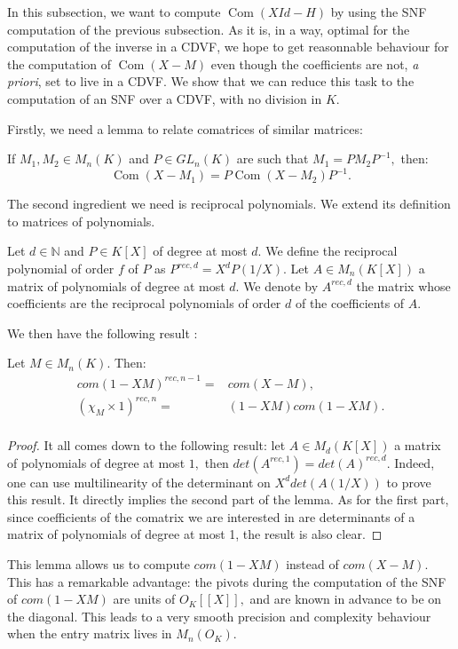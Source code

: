\documentclass{sig-alternate-05-2015}
\DeclareMathOperator{\com}{Com}
\begin{document}
In this subsection, we want to compute $\com (X Id -H)$
by using the SNF computation of the previous subsection.
As it is, in a way, optimal for the computation of the
inverse in a CDVF, we hope to get reasonnable behaviour
for the computation of $\com (X-M)$ even though the coefficients
are not, \textit{a priori}, set to live in a CDVF.
We show that we can reduce this task to the computation
of an SNF over a CDVF, with no division in $K.$

Firstly, we need a lemma to relate comatrices of
similar matrices:

\begin{lem} \label{lem:comatrix_of_similar}
If $M_1,M_2 \in M_n(K)$ and $P \in GL_n (K)$ are such that
$M_1=PM_2P^{-1},$ then:
\[ \com (X-M_1)=P \com (X-M_2) P^{-1}. \] 
\end{lem}

The second ingredient we need is reciprocal polynomials.
We extend its definition to matrices of polynomials.
\begin{deftn}
Let $d \in \mathbb{N}$ and $P \in K[X]$ of degree at most $d.$ 
We define the reciprocal polynomial of order $f$ of $P$ as $P^{rec,d}=X^d P \left( 1/X \right).$
Let $A \in M_n(K[X])$ a matrix of polynomials of degree at most $d.$
We denote by $A^{rec,d}$ the matrix
whose coefficients are the reciprocal polynomials of order $d$ 
of the coefficients of $A.$ 
\end{deftn}
We then have the following result :
\begin{lem}
Let $M \in M_n(K).$ Then:
\begin{eqnarray*}
com(1-XM)^{rec,n-1}=&com(X-M), \\
(\chi_M \times 1)^{rec,n}=&(1-XM) com(1-XM).\\
\end{eqnarray*}
\end{lem}
\begin{proof}
It all comes down to the following result:
let $A \in M_d(K[X])$ a matrix of polynomials of degree at most $1,$
then $det (A^{rec,1})=det(A)^{rec,d}.$
Indeed, one can use multilinearity of the determinant on $X^d det(A(1/X))$
to prove this result.
It directly implies the second part of the lemma.
As for the first part, since coefficients of the comatrix we are interested in
are determinants of a matrix of polynomials of degree at most 1, the result
is also clear.
\end{proof}

This lemma allows us to compute $com(1-XM)$ instead of $com(X-M).$
This has a remarkable advantage: the pivots during the computation of
the SNF of $com(1-XM)$ are units of $O_K[[X]],$ and are known
in advance to be on the diagonal. This leads to a very smooth
precision and complexity behaviour when the entry matrix lives in 
$M_n(O_K).$ 
\end{document}
